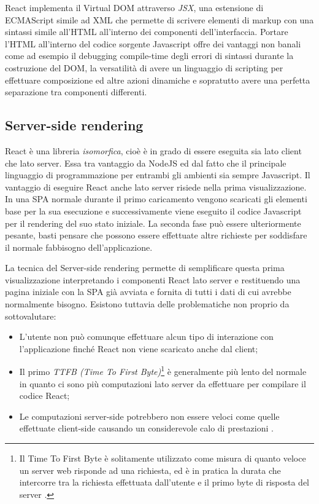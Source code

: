 \noindent
React implementa il Virtual DOM attraverso \textit{JSX}, una estensione di ECMAScript simile ad XML che permette di scrivere elementi di markup con una sintassi simile all'HTML all'interno dei componenti dell'interfaccia. Portare l'HTML all'interno del codice sorgente Javascript offre dei vantaggi non banali come ad esempio il debugging compile-time degli errori di sintassi durante la costruzione del DOM, la versatilità di avere un linguaggio di scripting per effettuare composizione ed altre azioni dinamiche e sopratutto avere una perfetta separazione tra componenti differenti.

\subsection{Server-side rendering}
React è una libreria \textit{isomorfica}, cioè è in grado di essere eseguita sia lato client che lato server. Essa tra vantaggio da NodeJS ed dal fatto che il principale linguaggio di programmazione per entrambi gli ambienti sia sempre Javascript.
Il vantaggio di eseguire React anche lato server risiede nella prima visualizzazione. In una SPA normale durante il primo caricamento vengono scaricati gli elementi base per la sua esecuzione e successivamente viene eseguito il codice Javascript per il rendering del suo stato iniziale. La seconda fase può essere ulteriormente pesante, basti pensare che possono essere effettuate altre richieste per soddisfare il normale fabbisogno dell'applicazione.

La tecnica del Server-side rendering permette di semplificare questa prima visualizzazione interpretando i componenti React lato server e restituendo una pagina iniziale con la SPA già avviata e fornita di tutti i dati di cui avrebbe normalmente bisogno. Esistono tuttavia delle problematiche non proprio da sottovalutare: 

\begin{itemize}
    \item L'utente non può comunque effettuare alcun tipo di interazione con l'applicazione finché React non viene scaricato anche dal client;
    \item Il primo \textit{TTFB (Time To First Byte)}\footnote{Il Time To First Byte è solitamente utilizzato come misura di quanto veloce un server web risponde ad una richiesta, ed è in pratica la durata che intercorre tra la richiesta effettuata dall'utente e il primo byte di risposta del server \cite{GrahamOnTTFB}.} è generalmente più lento del normale in quanto ci sono più computazioni lato server da effettuare per compilare il codice React;
    \item Le computazioni server-side potrebbero non essere veloci come quelle effettuate client-side causando un considerevole calo di prestazioni \cite{GrigoryanOnServerSideRendering}.
\end{itemize}